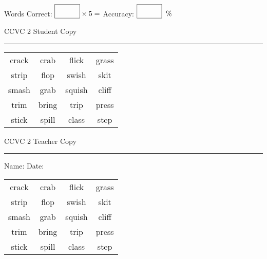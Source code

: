 \documentclass{memoir}
\begin{document}
\small

Words Correct: $\fbox{\phantom{\huge 100}} \times 5 = $ Accuracy: $\fbox{\phantom{\huge 100}}\;\; \%$ 

\vfill

\newpage


\footnotesize \noindent
CCVC 2 \hfill Student Copy
\smallskip
\hrule

\Large

\setlength{\tabcolsep}{14pt}
\def\arraystretch{3}

{\selectfont


\begin{vplace}[0.5]
\begin{center}
\begin{tabular}{cccc}
crack       & crab        & flick            & grass                    \\
strip & flop & swish & skit \\
smash & grab                    & squish & cliff            \\
trim & bring      & trip & press       \\
stick & spill & class             & step \\
\end{tabular}
\end{center}
\end{vplace}

}

\newpage

\footnotesize \noindent
CCVC 2 \hfill Teacher Copy
\smallskip
\hrule

\small

\vfill

\noindent
Name: \underline{\hspace{1.75in}} \hfill Date: \underline{\hspace{1in}}

\Large

{\selectfont


\begin{vplace}[0.5]
\begin{center}
\begin{tabular}{cccc}
crack       & crab        & flick            & grass                    \\
strip & flop & swish & skit \\
smash & grab                    & squish & cliff            \\
trim & bring      & trip & press       \\
stick & spill & class             & step \\
\end{tabular}
\end{center}
\end{vplace}



}
\end{document}
